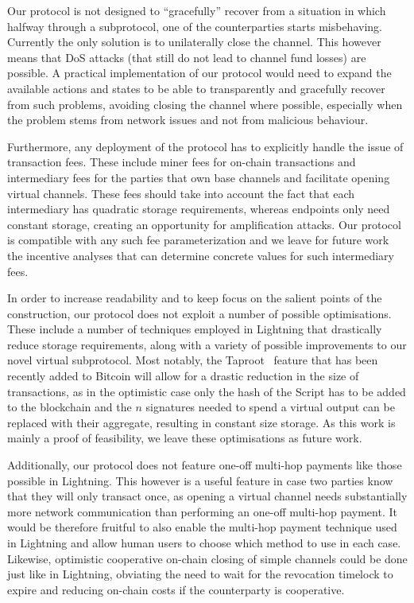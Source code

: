  Our protocol is not designed to ``gracefully'' recover
  from a situation in which halfway through a subprotocol, one of the
  counterparties starts misbehaving. Currently the only solution is to
  unilaterally close the channel. This however means that DoS attacks (that
  still do not lead to channel fund losses) are possible. A practical
  implementation of our protocol would need to expand the available actions and
  states to be able to transparently and gracefully recover from such problems,
  avoiding closing the channel where possible, especially when the problem stems
  from network issues and not from malicious behaviour.

  Furthermore, any deployment of the protocol has to explicitly handle the issue
  of transaction fees. These include miner fees for on-chain transactions and
  intermediary fees for the parties that own base channels and facilitate
  opening virtual channels. These fees should take into account the fact that
  each intermediary has quadratic storage requirements, whereas endpoints only
  need constant storage, creating an opportunity for amplification attacks. Our
  protocol is compatible with any such fee parameterization and we leave for
  future work the incentive analyses that can determine concrete values for such
  intermediary fees.

  In order to increase readability and to keep focus on the salient points of
  the construction, our protocol does not exploit a number of possible
  optimisations. These include a number of techniques employed in Lightning that
  drastically reduce storage requirements, along with a variety of possible
  improvements to our novel virtual subprotocol. Most notably, the
  Taproot~\cite{taproot} feature that has been recently added to Bitcoin will
  allow for a
  drastic reduction in the size of transactions, as in the optimistic case only
  the hash of the Script has to be added to the blockchain and the $n$
  signatures needed to spend a virtual output can be replaced with their
  aggregate, resulting in constant size storage. As this work is mainly a proof of
  feasibility, we leave these optimisations as future work.

  Additionally, our protocol does not feature one-off multi-hop payments like
  those possible in Lightning. This however is a useful feature in case two
  parties know that they will only transact once, as opening a virtual channel
  needs substantially more network communication than performing an one-off
  multi-hop payment. It would be therefore fruitful to also enable the multi-hop
  payment technique used in Lightning and allow human users to choose which
  method to use in each case. Likewise, optimistic cooperative on-chain closing
  of simple channels could be done just like in Lightning, obviating the need to
  wait for the revocation timelock to expire and reducing on-chain costs if the
  counterparty is cooperative.

